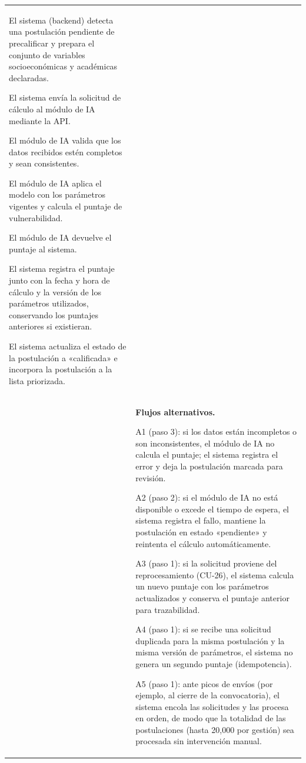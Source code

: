 \begin{longtable}{>{\raggedright\arraybackslash}p{2.9cm} >{\raggedright\arraybackslash}p{12.6cm}}
\begin{cupasos}
    \item El sistema (backend) detecta una postulación pendiente de precalificar y prepara el conjunto de variables socioeconómicas y académicas declaradas.
    \item El sistema envía la solicitud de cálculo al módulo de IA mediante la API.
    \item El módulo de IA valida que los datos recibidos estén completos y sean consistentes.
    \item El módulo de IA aplica el modelo con los parámetros vigentes y calcula el puntaje de vulnerabilidad.
    \item El módulo de IA devuelve el puntaje al sistema.
    \item El sistema registra el puntaje junto con la fecha y hora de cálculo y la versión de los parámetros utilizados, conservando los puntajes anteriores si existieran.
    \item El sistema actualiza el estado de la postulación a «calificada» e incorpora la postulación a la lista priorizada.
\end{cupasos} \\
 & \textbf{Flujos alternativos.}
\begin{cuvin}
    \item A1 (paso 3): si los datos están incompletos o son inconsistentes, el módulo de IA no calcula el puntaje; el sistema registra el error y deja la postulación marcada para revisión.
    \item A2 (paso 2): si el módulo de IA no está disponible o excede el tiempo de espera, el sistema registra el fallo, mantiene la postulación en estado «pendiente» y reintenta el cálculo automáticamente.
    \item A3 (paso 1): si la solicitud proviene del reprocesamiento (CU-26), el sistema calcula un nuevo puntaje con los parámetros actualizados y conserva el puntaje anterior para trazabilidad.
    \item A4 (paso 1): si se recibe una solicitud duplicada para la misma postulación y la misma versión de parámetros, el sistema no genera un segundo puntaje (idempotencia).
    \item A5 (paso 1): ante picos de envíos (por ejemplo, al cierre de la convocatoria), el sistema encola las solicitudes y las procesa en orden, de modo que la totalidad de las postulaciones (hasta 20,000 por gestión) sea procesada sin intervención manual.
\end{cuvin} \\

\end{longtable}
